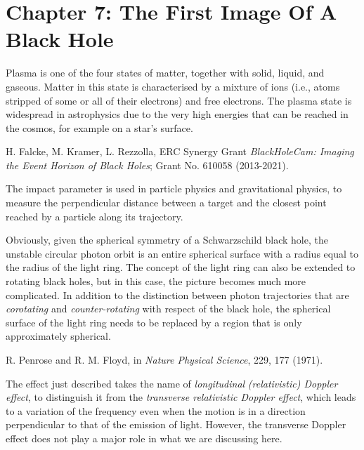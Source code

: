 \section*{Chapter 7: The First Image Of A Black Hole}
\begin{description}[style=multiline,leftmargin=2em,labelwidth=1.5em]

\item[1.]\hypertarget{note:07-01}{}Plasma is one of the four states of matter, together with solid,
liquid, and gaseous. Matter in this state is characterised by a mixture of
ions (i.e., atoms stripped of some or all of their electrons) and
free electrons. The plasma state is widespread in astrophysics due to the very high
energies that can be reached in the cosmos, for example on a star's surface.

\item[2.]\hypertarget{note:07-02}{}H. Falcke, M. Kramer, L. Rezzolla, ERC Synergy Grant \emph{BlackHoleCam: Imaging the
Event Horizon of Black Holes}; Grant No. 610058 (2013-2021).

\item[3.]\hypertarget{note:07-03}{}The impact parameter is used in particle physics and gravitational physics, to measure
the perpendicular distance between a target and the closest point reached by a particle
along its trajectory.

\item[4.]\hypertarget{note:07-04}{}Obviously, given the spherical symmetry of a Schwarzschild black
hole, the unstable circular photon orbit is an entire spherical
surface with a radius equal to the radius of the light ring. The concept of the light
ring can also be extended to rotating black holes, but in this case, the picture becomes
much more complicated. In addition to the distinction between photon trajectories that
are \emph{corotating} and \emph{counter-rotating} with respect of the black hole, the
spherical surface of the light ring needs to be replaced by a region that is only
approximately spherical.

\item[5.]\hypertarget{note:07-05}{}R. Penrose and R. M. Floyd, in \emph{Nature Physical Science}, 229, 177 (1971).

\item[6.]\hypertarget{note:07-06}{}The effect just described takes the name of \emph{longitudinal} \emph{(relativistic)
Doppler effect}, to distinguish it from the \emph{transverse
relativistic Doppler effect}, which leads to a variation of the frequency even when the
motion is in a direction perpendicular to that of the emission of light. However, the
transverse Doppler effect does not play a major role in what we are discussing here.


\end{description}
